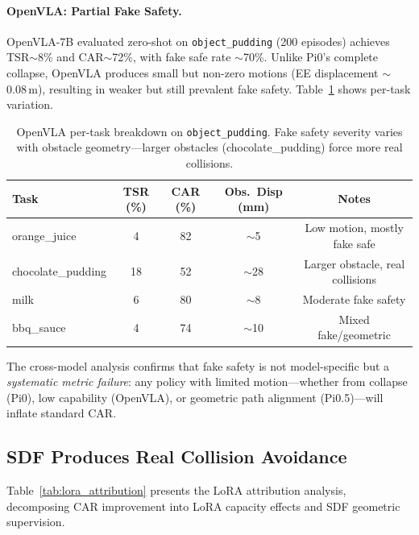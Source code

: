 \documentclass[10pt,twocolumn]{article}
\begin{document}
\paragraph{OpenVLA: Partial Fake Safety.}
OpenVLA-7B evaluated zero-shot on \texttt{object\_pudding} (200 episodes) achieves TSR$\sim$8\% and CAR$\sim$72\%, with fake safe rate $\sim$70\%. Unlike Pi0's complete collapse, OpenVLA produces small but non-zero motions (EE displacement $\sim$0.08\,m), resulting in weaker but still prevalent fake safety. Table~\ref{tab:openvla_tasks} shows per-task variation.

\begin{table}[h]
\centering
\caption{OpenVLA per-task breakdown on \texttt{object\_pudding}. Fake safety severity varies with obstacle geometry---larger obstacles (chocolate\_pudding) force more real collisions.}
\label{tab:openvla_tasks}
\small
\begin{tabular}{lcccc}
\toprule
Task & TSR (\%) & CAR (\%) & Obs.\ Disp (mm) & Notes \\
\midrule
orange\_juice & 4 & 82 & $\sim$5 & Low motion, mostly fake safe \\
chocolate\_pudding & 18 & 52 & $\sim$28 & Larger obstacle, real collisions \\
milk & 6 & 80 & $\sim$8 & Moderate fake safety \\
bbq\_sauce & 4 & 74 & $\sim$10 & Mixed fake/geometric \\
\bottomrule
\end{tabular}
\end{table}

The cross-model analysis confirms that fake safety is not model-specific but a \emph{systematic metric failure}: any policy with limited motion---whether from collapse (Pi0), low capability (OpenVLA), or geometric path alignment (Pi0.5)---will inflate standard CAR.

\subsection{SDF Produces Real Collision Avoidance}
\label{sec:sdf_real}

Table~\ref{tab:lora_attribution} presents the LoRA attribution analysis, decomposing CAR improvement into LoRA capacity effects and SDF geometric supervision.
\end{document}
